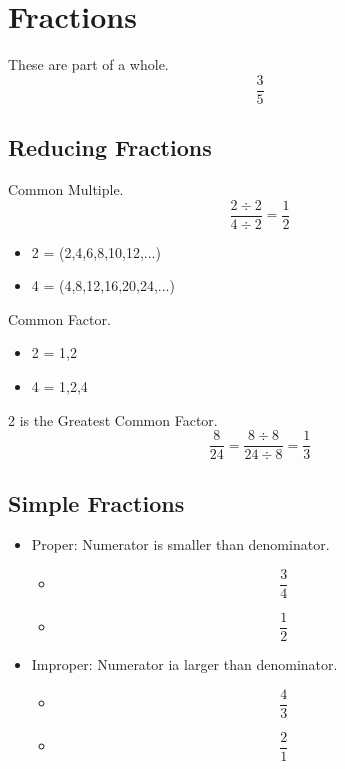 \documentclass[]{article}
\begin{document}
\section{Fractions}
These are part of a whole.
\begin{equation}
	\frac {3}{5} 
\end{equation}

\subsection{Reducing Fractions}
Common Multiple.
\begin{equation}
	\frac {2 \div 2}{4 \div 2} = \frac{1}{2}
\end{equation}
	\begin{itemize}
		\item 2 = (2,4,6,8,10,12,...)
		\item 4 = (4,8,12,16,20,24,...)
	\end{itemize}
Common Factor.
	\begin{itemize}
		\item 2 = 1,2
		\item 4 = 1,2,4
	\end{itemize}
		2 is the Greatest Common Factor.
\begin{equation}
\frac {8}{24} = \frac {8 \div 8}{24 \div 8} = \frac {1}{3}
\end{equation}

\subsection{Simple Fractions}
\begin{itemize}
	\item Proper: Numerator is smaller than denominator. 
	\begin{itemize}
		\item \begin{equation}
			\frac{3}{4} 
		\end{equation}
		\item \begin{equation}
			\frac{1}{2}
		\end{equation}
	\end{itemize}
	\item Improper: Numerator ia larger than denominator. 
		\begin{itemize}
			\item \begin{equation}
			\frac{4}{3} 
			\end{equation}
			\item \begin{equation}
			\frac{2}{1}
			\end{equation}
		\end{itemize}
\end{itemize}
\end{document}
